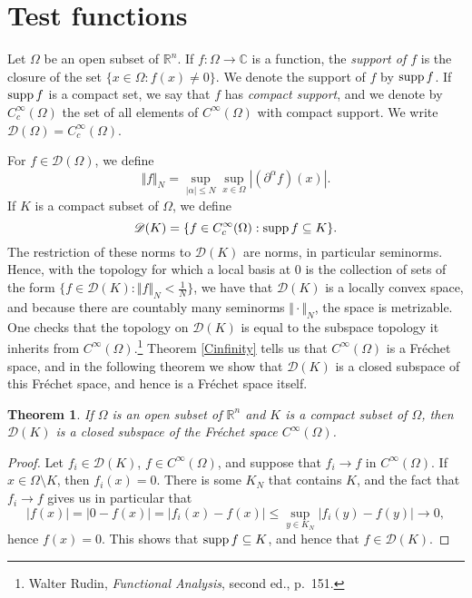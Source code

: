 \documentclass{article}
\newcommand{\supp}{\ensuremath\mathrm{supp}\,}
\newcommand{\norm}[1]{\Vert #1 \Vert}
\newtheorem{theorem}{Theorem}
\begin{document}
\section{Test functions}
Let $\Omega$ be an open subset of $\mathbb{R}^n$. If $f:\Omega \to \mathbb{C}$ is a function, the {\em support of $f$} is the closure of the set
$\{x \in \Omega: f(x) \neq 0\}$. We denote the support of $f$ by $\supp f$. If $\supp f$ is a compact set, we say that $f$ has {\em compact support}, and
we denote by $C_c^\infty(\Omega)$ the set of all elements of $C^\infty(\Omega)$ with compact support.
We  write $\mathscr{D}(\Omega)=C_c^\infty(\Omega)$.

For $f \in \mathscr{D}(\Omega)$, we define
\[
\norm{f}_N = \sup_{|\alpha| \leq N} \sup_{x \in \Omega} |(\partial^\alpha f)(x)|.
\]
If $K$ is a compact subset of $\Omega$, we define
\[
\mathscr{D}(K) = \{f \in C_c^\infty(\Omega): \supp f \subseteq K\}.
\]
The restriction of these norms to $\mathscr{D}(K)$ are norms, in particular seminorms.
Hence,
with the topology for which a local basis at $0$ is the collection of
 sets of the form $\{f \in \mathscr{D}(K): \norm{f}_N <\frac{1}{N}\}$, we have that $\mathscr{D}(K)$ is a locally convex space, and because
 there are countably many seminorms $\norm{\cdot}_N$, the space is metrizable.
 One checks that the topology on $\mathscr{D}(K)$ is equal to the subspace topology it inherits from $C^\infty(\Omega)$.\footnote{Walter
Rudin, {\em Functional Analysis}, second ed., p.~151.}
 Theorem \ref{Cinfinity} tells us that $C^\infty(\Omega)$ is a Fr\'echet space, and in the following
 theorem we show that $\mathscr{D}(K)$ is a closed subspace of this Fr\'echet space, and hence is a Fr\'echet space itself.
 
 \begin{theorem}
 If $\Omega$ is an open subset of $\mathbb{R}^n$ and $K$ is a compact subset of $\Omega$, then $\mathscr{D}(K)$ is a closed subspace of the Fr\'echet
 space $C^\infty(\Omega)$.
 \end{theorem}
 \begin{proof}
 Let $f_i \in \mathscr{D}(K)$, $f \in C^\infty(\Omega)$, and suppose that $f_i \to f$ in $C^\infty(\Omega)$.
 If $x \in \Omega \setminus K$, then $f_i(x)=0$.
 There is some $K_N$ that contains $K$, and the fact
 that $f_i \to f$ gives us in particular that
 \[
|f(x)| = |0-f(x)|=|f_i(x)-f(x)| \leq  \sup_{y \in K_N}|f_i(y)-f(y)| \to 0,
 \]
hence $f(x)=0$. This shows that $\supp f \subseteq K$, and hence that $f \in \mathscr{D}(K)$.
 \end{proof}
 
\end{document}
